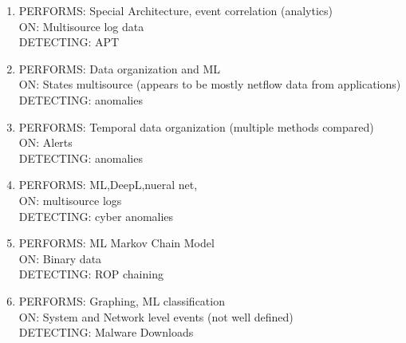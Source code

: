 \documentclass[conference]{IEEEtran}
\begin{document}
\begin{enumerate}
    \cite{lee1999data}
    \item
    PERFORMS: Special Architecture, event correlation (analytics)  \\
    ON:  Multisource log data\\
    DETECTING:  APT
    \cite{bhatt2014towards}
    \item
    PERFORMS: Data organization and ML \\
    ON: States multisource (appears to be mostly netflow data from applications)  \\
    DETECTING: anomalies
    \cite{hajamydeen2016unsupervised}   
    \item
    PERFORMS: Temporal data organization (multiple methods compared)  \\
    ON: Alerts \\
    DETECTING: anomalies
    \cite{pierazzi2016exploratory}
    \item
    PERFORMS: ML,DeepL,nueral net,  \\
    ON: multisource logs \\
    DETECTING: cyber anomalies
    \cite{du2017deeplog}
    \item
    PERFORMS: ML Markov Chain Model  \\
    ON: Binary data \\
    DETECTING: ROP chaining 
    \cite{usui2016poster}
    \item
    PERFORMS: Graphing, ML classification \\
    ON: System and Network level events (not well defined) \\
    DETECTING: Malware Downloads
    \cite{rahbarinia2016real}
\end{enumerate}



\end{document}
